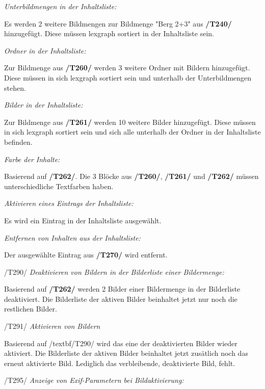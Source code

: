 \begin{description}
			\item[/T260/] \textit{Unterbildmengen in der Inhaltsliste:}\par Es werden 2 weitere Bildmengen zur Bildmenge "Berg 2+3" aus \textbf{/T240/} hinzugefügt. Diese müssen \gls{lexgraph} sortiert in der Inhaltsliste sein.
			\item[/T261/] \textit{Ordner in der Inhaltsliste:}\par Zur Bildmenge aus \textbf{/T260/} werden 3 weitere Ordner mit Bildern hinzugefügt. Diese müssen in sich \gls{lexgraph} sortiert sein und unterhalb der Unterbildmengen stehen.
			\item[/T262/] \textit{Bilder in der Inhaltsliste:}\par Zur Bildmenge aus \textbf{/T261/} werden 10 weitere Bilder hinzugefügt. Diese müssen in sich \gls{lexgraph} sortiert sein und sich alle unterhalb der Ordner in der Inhaltsliste befinden.
			\item[/T263/] \textit{Farbe der Inhalte:}\par Basierend auf \textbf{/T262/}. Die 3 Blöcke aus \textbf{/T260/}, \textbf{/T261/} und \textbf{/T262/} müssen unterschiedliche Textfarben haben. 
		
			\item[/T270/] \textit{Aktivieren eines Eintrags der Inhaltsliste:}\par Es wird ein Eintrag in der Inhaltsliste ausgewählt.
		
			\item[/T280/] \textit{Entfernen von Inhalten aus der Inhaltsliste:}\par Der ausgewählte Eintrag aus \textbf{/T270/} wird entfernt.
		
			\item{/T290/} \textit{Deaktivieren von Bildern in der Bilderliste einer Bildermenge:}\par Basierend auf \textbf{/T262/} werden 2 Bilder einer Bildermenge in der Bilderliste deaktiviert. Die Bilderliste der aktiven Bilder beinhaltet jetzt nur noch die restlichen Bilder.
			\item{/T291/} \textit{Aktivieren von Bildern}\par Basierend auf /textbf{/T290/} wird das eine der deaktivierten Bilder wieder aktiviert. Die Bilderliste der aktiven Bilder beinhaltet jetzt zusätlich noch das erneut aktivierte Bild. Lediglich das verbleibende, deaktivierte Bild, fehlt.
			
			\item{/T295/} \textit{Anzeige von Exif-Parametern bei Bildaktivierung:}\par
			
		\end{description}
	
